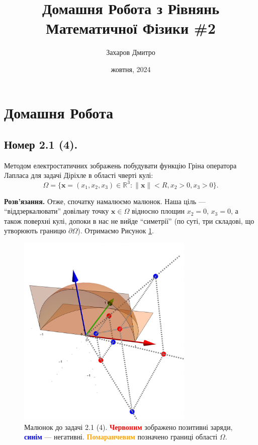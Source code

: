 \documentclass{hw_template}
\title{\huge\sffamily\bfseries Домашня Робота з Рівнянь Математичної Фізики \#2}
\author{\Large\sffamily Захаров Дмитро}
\date{\sffamily 5 жовтня, 2024}
\begin{document}
\pagestyle{fancy}

\maketitle

\tableofcontents

\pagebreak

\section{Домашня Робота}

\subsection{Номер 2.1 (4).}

\begin{problem}
    Методом електростатичних зображень побудувати функцію Гріна оператора Лапласа для задачі Діріхле в області чверті кулі:
    \begin{equation*}
        \Omega = \{\mathbf{x}=(x_1,x_2,x_3) \in \mathbb{R}^3: \|\mathbf{x}\| < R, x_2 > 0, x_3 > 0\}.
    \end{equation*}
\end{problem}

\textbf{Розв'язання.} Отже, спочатку намалюємо малюнок. Наша ціль --- ``віддзеркалювати'' довільну точку $\mathbf{x} \in \Omega$ відносно площин $x_2=0$, $x_3=0$, а також поверхні кулі, допоки в нас не вийде ``симетрії'' (по суті, три складові, що утворюють границю $\partial\Omega$). Отримаємо Рисунок \ref{fig:hw_2_problem_1}.

\begin{figure}[H]
    \centering
    \includegraphics[width=0.75\textwidth]{images/hw_2_problem_1.png}
    \caption{Малюнок до задачі 2.1 (4). \textcolor{red}{\textbf{Червоним}} зображено позитивні заряди, \textcolor{blue}{\textbf{синім}} --- негативні. \textcolor{orange}{\textbf{Помаранчевим}} позначено границі області $\Omega$.}
    \label{fig:hw_2_problem_1}
\end{figure}
\pagebreak
\end{document}
